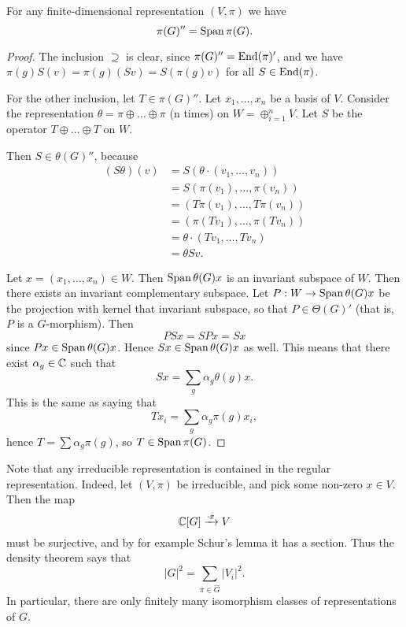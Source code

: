 \documentclass[11pt, english]{article}
\begin{document}
\begin{thm}
\label{seconddensity}
 For any finite-dimensional representation $(V,\pi)$ we have 
\[
\pi(G)'' = \operatorname{Span}{\pi(G)}.
\]
\end{thm}
\begin{proof}
The inclusion $\supseteq$ is clear, since $\pi(G)''=\operatorname{End}(\pi)'$, and we have $\pi(g) S(v) = \pi(g) (Sv) = S (\pi(g)v)$ for all $S \in \operatorname{End}(\pi)$.

For the other inclusion, let $T \in \pi(G)''$. Let $x_1,\ldots,x_n$ be a basis of $V$. Consider the representation $\theta = \pi \oplus \ldots \oplus \pi$ (n times) on $W = \oplus_{i=1}^n V$. Let $S$ be the operator $T \oplus \ldots \oplus T$ on $W$. 

Then $S \in \theta(G)''$, because 
\begin{align*}
  (S\theta )(v) &= S( \theta \cdot (v_1,\ldots,v_n)) \\
&= S( \pi(v_1),\ldots, \pi(v_n)) \\
&= (T\pi(v_1),\ldots, T\pi(v_n)) \\
&= (\pi(Tv_1), \ldots, \pi(Tv_n)) \\
&= \theta \cdot ( Tv_1,\ldots, Tv_n) \\
&= \theta  Sv.
\end{align*}

Let $x=(x_1,\ldots,x_n) \in W$. Then $\operatorname{Span}{\theta (G) x }$ is an invariant subspace of $W$. Then there exists an invariant complementary subspace. Let $P:W \to \operatorname{Span}{\theta(G)x}$ be the projection with kernel that invariant subspace, so that $P \in \Theta(G)'$ (that is, $P$ is a $G$-morphism). Then
$$
PSx = SPx = Sx
$$
since $P x \in \operatorname{Span}{\theta(G)x}$. Hence $Sx \in \operatorname{Span} { \theta(G)x }$ as well. This means that there exist $\alpha_g \in \mathbb{C}$ such that
$$
Sx = \sum_g \alpha_g \theta(g)x.
$$
This is the same as saying that
$$
Tx_i = \sum_g \alpha_g \pi(g)x_i,
$$
hence $T = \sum \alpha_g \pi(g)$, so $T \in \operatorname{Span} \pi(G)$.
\end{proof}

\begin{remark}
\label{remarksum}
Note that any irreducible representation is contained in the regular representation. Indeed, let $(V,\pi)$ be irreducible, and pick some non-zero $x \in V$. Then the map
$$
\mathbb{C}[G] \xrightarrow{\cdot x} V
$$
must be surjective, and by for example Schur's lemma it has a section. Thus the density theorem says that 
$$
\lvert G \rvert ^2  = \sum_{\overline{\pi} \in \widehat G} \lvert V_i \rvert^2.
$$
In particular, there are only finitely many isomorphism classes of representations of $G$.
\end{remark}
\end{document}
